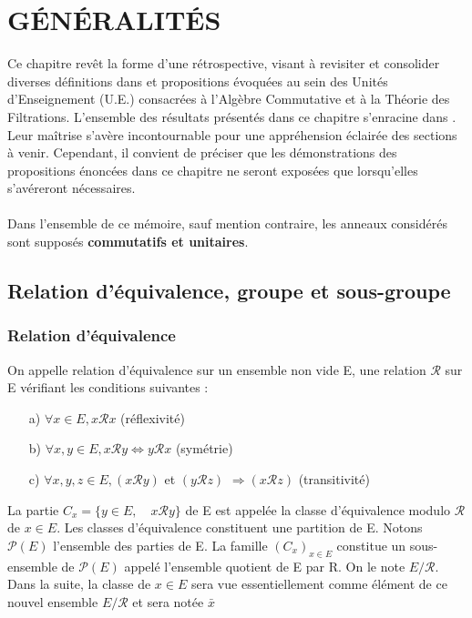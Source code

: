 \chapter{GÉNÉRALITÉS}
Ce chapitre revêt la forme d'une rétrospective, visant à revisiter et consolider diverses définitions dans \cite{5} et propositions évoquées au sein des Unités d'Enseignement (U.E.) consacrées à l'Algèbre Commutative et à la Théorie des Filtrations. L'ensemble des résultats présentés dans ce chapitre s'enracine dans \cite{6}. Leur maîtrise s'avère incontournable pour une appréhension éclairée des sections à venir. Cependant, il convient de préciser que les démonstrations des propositions énoncées dans ce chapitre ne seront exposées que lorsqu'elles s'avéreront nécessaires. \\\\ Dans l'ensemble de ce mémoire, sauf mention contraire, les anneaux considérés sont supposés \textbf{commutatifs et unitaires}.
\section{Relation d'équivalence, groupe et sous-groupe}
\subsection{Relation d'équivalence}
\begin{madefinition}
	On appelle relation d’équivalence sur un ensemble non vide E, une relation
	$\mathcal{R}$ sur E vérifiant les conditions suivantes :
	\begin{enumerate}
		\item[a)] $\forall x \in E, x\mathcal{R}x$ (réflexivité)
		\item[b)] $\forall x,y \in E, x\mathcal{R}y \Longleftrightarrow y\mathcal{R}x $ (symétrie)
		\item[c)] $\forall x,y,z \in E, (x\mathcal{R}y)$ et $(y\mathcal{R}z)$ $\Longrightarrow (x\mathcal{R}z)$  (transitivité)
	\end{enumerate}
	La partie $C_x = \{y \in E,\quad x\mathcal{R}y\}  $ de E est appelée la classe d’équivalence modulo $\mathcal{R}$ de $x \in E$. Les	classes d’équivalence constituent une partition de E. Notons $\mathcal{P}(E)$ l’ensemble des parties de E. La famille $(C_x)_{x \in E}$ constitue un sous-ensemble de $\mathcal{P}(E)$ appelé l’ensemble quotient de E par R. On le note $E/\mathcal{R}$. 
	Dans la suite, la classe de $x \in E$ sera vue essentiellement comme élément de ce nouvel ensemble $E/\mathcal{R}$ et sera notée $\bar{x}$
\end{madefinition}
